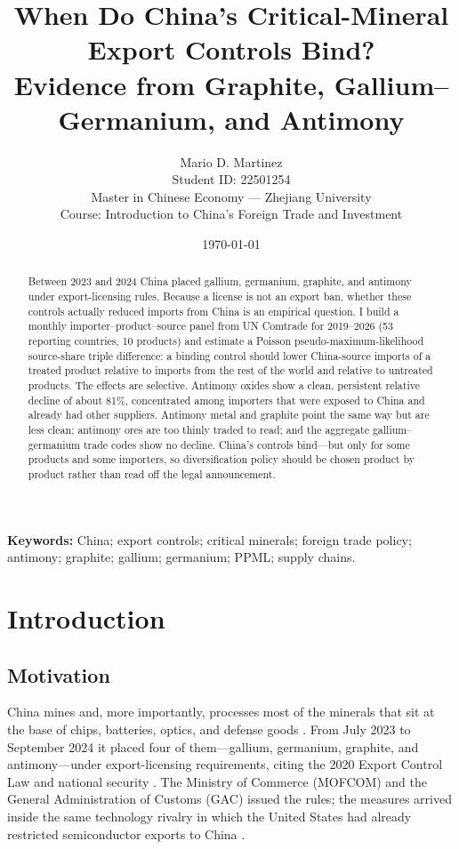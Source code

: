 \documentclass[12pt,a4paper]{article}
\title{\bfseries When Do China's Critical-Mineral Export Controls Bind?\\[4pt]
\large\normalfont Evidence from Graphite, Gallium--Germanium, and Antimony}
\author{Mario D. Martinez\\[2pt]
\small Student ID: 22501254\\
\small Master in Chinese Economy --- Zhejiang University\\
\small Course: Introduction to China's Foreign Trade and Investment}
\date{\today}
\begin{document}
\maketitle

\begin{abstract}
\noindent
Between 2023 and 2024 China placed gallium, germanium, graphite, and antimony
under export-licensing rules. Because a license is not an export ban, whether
these controls actually reduced imports from China is an empirical question. I
build a monthly importer--product--source panel from UN Comtrade for
2019--2026 (53 reporting countries, 10 products) and estimate a Poisson
pseudo-maximum-likelihood source-share triple difference: a binding control
should lower China-source imports of a treated product relative to imports from
the rest of the world and relative to untreated products. The effects are
selective. Antimony oxides show a clean, persistent relative decline of about
81\%, concentrated among importers that were exposed to China and already had
other suppliers. Antimony metal and graphite point the same way but are less
clean; antimony ores are too thinly traded to read; and the aggregate
gallium--germanium trade codes show no decline. China's controls bind---but
only for some products and some importers, so diversification policy should be
chosen product by product rather than read off the legal announcement.
\end{abstract}

\medskip
\noindent\textbf{Keywords:} China; export controls; critical minerals; foreign
trade policy; antimony; graphite; gallium; germanium; PPML; supply chains.

\newpage
\tableofcontents
\newpage

\section{Introduction}\label{sec:intro}

\subsection{Motivation}

China mines and, more importantly, processes most of the minerals that sit at
the base of chips, batteries, optics, and defense goods
\citep{iea_2025_global_critical_minerals_outlook}. From July 2023 to September
2024 it placed four of them---gallium, germanium, graphite, and antimony---under
export-licensing requirements, citing the 2020 Export Control Law and national
security \citep{prc_2020_export_control_law}. The Ministry of Commerce (MOFCOM)
and the General Administration of Customs (GAC) issued the rules; the measures
arrived inside the same technology rivalry in which the United States had
already restricted semiconductor exports to China
\citep{bown-2020-howunitedstates, bown2024semiconductors}.
\end{document}
